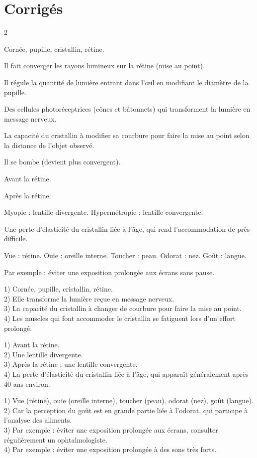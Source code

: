 \section{Corrigés}
\begin{multicols}{2}

Cornée, pupille, cristallin, rétine.

Il fait converger les rayons lumineux sur la rétine (mise au point).

Il régule la quantité de lumière entrant dans l'œil en modifiant le diamètre de la
pupille.

Des cellules photoréceptrices (cônes et bâtonnets) qui transforment la lumière en message
nerveux.

La capacité du cristallin à modifier sa courbure pour faire la mise au point selon la
distance de l'objet observé.

Il se bombe (devient plus convergent).

Avant la rétine.

Après la rétine.

Myopie : lentille divergente. Hypermétropie : lentille convergente.

Une perte d'élasticité du cristallin liée à l'âge, qui rend l'accommodation de près
difficile.

Vue : rétine. Ouïe : oreille interne. Toucher : peau. Odorat : nez. Goût : langue.

Par exemple : éviter une exposition prolongée aux écrans sans pause.

1) Cornée, pupille, cristallin, rétine.\\
2) Elle transforme la lumière reçue en message nerveux.\\
3) La capacité du cristallin à changer de courbure pour faire la mise au point.\\
4) Les muscles qui font accommoder le cristallin se fatiguent lors d'un effort prolongé.

1) Avant la rétine.\\
2) Une lentille divergente.\\
3) Après la rétine ; une lentille convergente.\\
4) La perte d'élasticité du cristallin liée à l'âge, qui apparaît généralement après $40$
ans environ.

1) Vue (rétine), ouïe (oreille interne), toucher (peau), odorat (nez), goût (langue).\\
2) Car la perception du goût est en grande partie liée à l'odorat, qui participe à
l'analyse des aliments.\\
3) Par exemple : éviter une exposition prolongée aux écrans, consulter régulièrement un
ophtalmologiste.\\
4) Par exemple : éviter une exposition prolongée à des sons très forts.

\end{multicols}
\exercicesBanner
